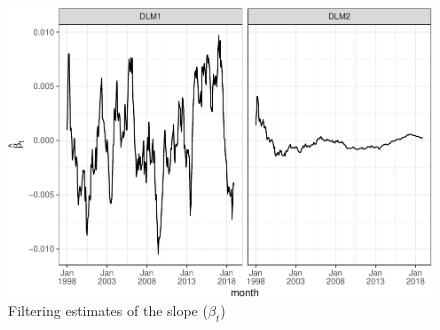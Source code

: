 \documentclass[]{article}
\begin{document}
\begin{figure}
\centering
\includegraphics{../figs/freq--trend-growth-1.pdf}
\caption{\label{fig:trend-growth}Filtering estimates of the slope
(\(\beta_t\))}
\end{figure}
\end{document}
